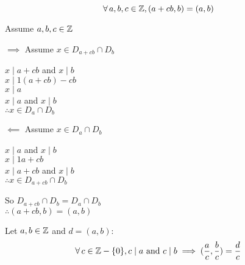 \documentclass[letterpaper,12pt,fleqn]{article}
\begin{document}
\begin{theorem}
  \listbreak
  \[\forall\,a,b,c\in\mathbb{Z},(a+cb,b)=(a,b)\]
\end{theorem}

\begin{theproof}
  Assume $a,b,c\in\mathbb{Z}$
  \begin{description}
  \item $\implies$ Assume $x\in D_{a+cb}\cap D_b$

    $x\mid a+cb$ and $x\mid b$ \\
    $x\mid 1(a+cb)-cb$ \\
    $x\mid a$ \\
    $x\mid a$ and $x\mid b$ \\
    $\therefore x\in D_a\cap D_b$

  \item $\impliedby$ Assume $x\in D_a\cap D_b$
    
    $x\mid a$ and $x\mid b$ \\
    $x\mid 1a+cb$ \\
    $x\mid a+cb$ and $x\mid b$ \\
    $\therefore x\in D_{a+cb}\cap D_b$
  \end{description}

  So $D_{a+cb}\cap D_b=D_a\cap D_b$ \\
  $\therefore (a+cb,b)=(a,b)$ \\
\end{theproof}

\begin{theorem}
  Let $a,b\in\mathbb{Z}$ and $d=(a,b)$:
  \[\forall\,c\in\Z-\{0\},c\mid a\ \mbox{and}\ c\mid b\implies
      (\frac{a}{c},\frac{b}{c})=\frac{d}{c}\]
\end{theorem}
\end{document}

